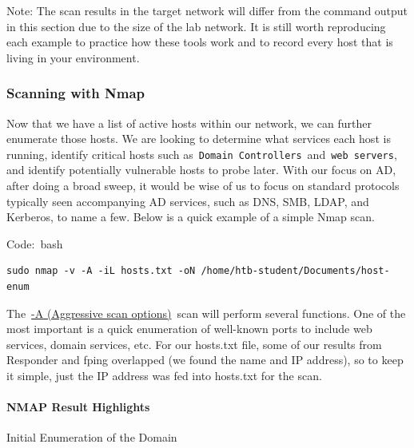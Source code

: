 Note: The scan results in the target network will differ from the command output in this section due to the size of the lab network. It is still worth reproducing each example to practice how these tools work and to record every host that is living in your environment.

\subsubsection{Scanning with Nmap}
Now that we have a list of active hosts within our network, we can further enumerate those hosts. We are looking to determine what services each host is running, identify critical hosts such as \verb|Domain Controllers| and \verb|web servers|, and identify potentially vulnerable hosts to probe later. With our focus on AD, after doing a broad sweep, it would be wise of us to focus on standard protocols typically seen accompanying AD services, such as DNS, SMB, LDAP, and Kerberos, to name a few. Below is a quick example of a simple Nmap scan.

Code: bash

\begin{verbatim}
sudo nmap -v -A -iL hosts.txt -oN /home/htb-student/Documents/host-enum 
\end{verbatim}

The \href{https://nmap.org/book/man-misc-options.html}{-A (Aggressive scan options)} scan will perform several functions. One of the most important is a quick enumeration of well-known ports to include web services, domain services, etc. For our hosts.txt file, some of our results from Responder and fping overlapped (we found the name and IP address), so to keep it simple, just the IP address was fed into hosts.txt for the scan.

\paragraph{NMAP Result Highlights}

Initial Enumeration of the Domain

